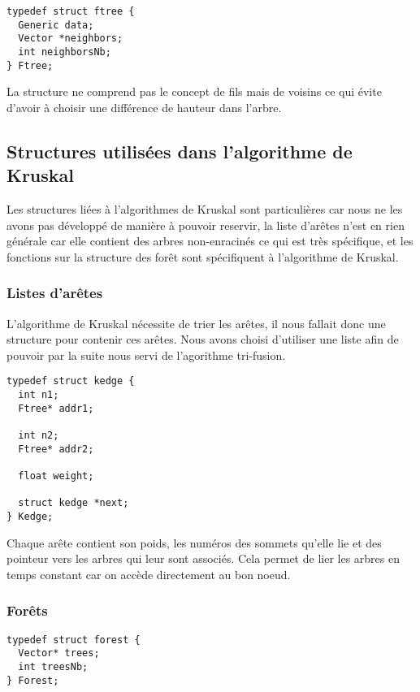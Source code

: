 \documentclass[a4paper]{article}
\begin{document}
\begin{verbatim}
typedef struct ftree {
  Generic data;
  Vector *neighbors;
  int neighborsNb;
} Ftree;
\end{verbatim}

La structure ne comprend pas le concept de fils mais de voisins ce qui évite d'avoir à choisir une différence de hauteur dans l'arbre.

\subsection{Structures utilisées dans l'algorithme de Kruskal}

Les structures liées à l'algorithmes de Kruskal sont particulières car nous ne les avons pas développé de manière à pouvoir reservir, la liste d'arêtes n'est en rien générale car elle contient des arbres non-enracinés ce qui est très spécifique, et les fonctions sur la structure des forêt sont spécifiquent à l'algorithme de Kruskal.

\subsubsection{Listes d'arêtes}

L'algorithme de Kruskal nécessite de trier les arêtes, il nous fallait donc une structure pour contenir ces arêtes. Nous avons choisi d'utiliser une liste afin de pouvoir par la suite nous servi de l'agorithme tri-fusion.

\begin{verbatim}
typedef struct kedge {
  int n1;
  Ftree* addr1;

  int n2;
  Ftree* addr2;

  float weight;

  struct kedge *next;
} Kedge;
\end{verbatim}

Chaque arête contient son poids, les numéros des sommets qu'elle lie et des pointeur vers les arbres qui leur sont associés. Cela permet de lier les arbres en temps constant car on accède directement au bon noeud.

\subsubsection{Forêts}

\begin{verbatim}
typedef struct forest {
  Vector* trees;
  int treesNb;
} Forest;
\end{verbatim}
\end{document}
